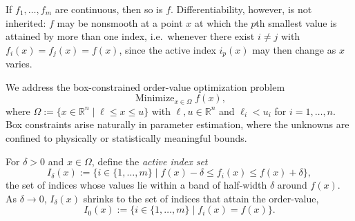 \documentclass[11pt]{article}
\newcommand{\minimize}{\mathop{\text{Minimize}}}
\begin{document}
If $f_1, \ldots, f_m$ are continuous, then so is $f$. Differentiability,
however, is not inherited: $f$ may be nonsmooth at a point $x$ at which the
$p$th smallest value is attained by more than one index, i.e.\ whenever there
exist $i \neq j$ with $f_i(x) = f_j(x) = f(x)$, since the active index $i_p(x)$
may then change as $x$ varies.

We address the box-constrained order-value optimization problem
\begin{equation}
    \minimize_{x \in \Omega} f(x), \label{ovo-problem}
\end{equation}
where $\Omega := \{x \in \mathbb{R}^n \mid \ell \leq x \leq u\}$ with
$\ell, u \in \mathbb{R}^n$ and $\ell_i < u_i$ for $i = 1, \ldots, n$. Box
constraints arise naturally in parameter estimation, where the unknowns are
confined to physically or statistically meaningful bounds.

For $\delta > 0$ and $x \in \Omega$, define the \textit{active index set}
\begin{equation}
    I_\delta(x) := \{i \in \{1, \ldots, m\} \mid
    f(x) - \delta \leq f_i(x) \leq f(x) + \delta\}, \label{idelta}
\end{equation}
the set of indices whose values lie within a band of half-width $\delta$ around
$f(x)$. As $\delta \to 0$, $I_\delta(x)$ shrinks to the set of indices that
attain the order-value,
\begin{equation*}
    I_0(x) := \{i \in \{1, \ldots, m\} \mid f_i(x) = f(x)\}.
\end{equation*}
\end{document}
